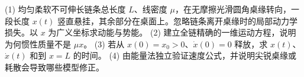 (1) 均匀柔软不可伸长链条总长度 \(L\)、线密度 \(\mu\)，在无摩擦光滑圆角桌缘转向，一段长度 \(x(t)\) 竖直悬挂，其余部分在桌面上。忽略链条离开桌缘时的局部动力学损失。以 \(x\) 为广义坐标求动能与势能。
(2) 建立全链精确的一维运动方程，说明为何惯性质量不是 \(\mu x\)。
(3) 若从 \(x(0)=x_0>0\)、\(\dot x(0)=0\) 释放，求 \(x(t)\)、\(\dot x(t)\) 和到 \(x=L\) 的时间。
(4) 由能量法独立验证速度公式，并说明尖锐桌缘或耗散会导致哪些模型修正。
